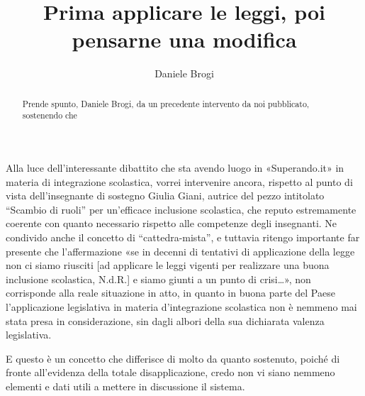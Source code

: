 \author{Daniele Brogi}
\title{Prima applicare le leggi, poi pensarne una modifica}
\label{brogi030513}
\begin{abstract}
Prende spunto, Daniele Brogi, da un precedente intervento da noi pubblicato, sostenendo che 
\end{abstract}
\maketitle
{}
Alla luce dell'interessante dibattito che sta avendo luogo in «Superando.it» in materia di integrazione scolastica, vorrei intervenire ancora, rispetto al punto di vista dell'insegnante di sostegno Giulia Giani, autrice del pezzo intitolato “Scambio di ruoli” per un'efficace inclusione scolastica\pageref{cha:giani300413}, che reputo estremamente coerente con quanto necessario rispetto alle competenze degli insegnanti. Ne condivido anche il concetto di “cattedra-mista”, e tuttavia ritengo importante far presente che l'affermazione «se in decenni di tentativi di applicazione della legge non ci siamo riusciti [ad applicare le leggi vigenti per realizzare una buona inclusione scolastica, N.d.R.] e siamo giunti a un punto di crisi\dots», non corrisponde alla reale situazione in atto, in quanto in buona parte del Paese l'applicazione legislativa in materia d'integrazione scolastica non è nemmeno mai stata presa in considerazione, sin dagli albori della sua dichiarata valenza legislativa.

E questo è un concetto che differisce di molto da quanto sostenuto, poiché di fronte all'evidenza della totale disapplicazione, credo non vi siano nemmeno elementi e dati utili a mettere in discussione il sistema.

